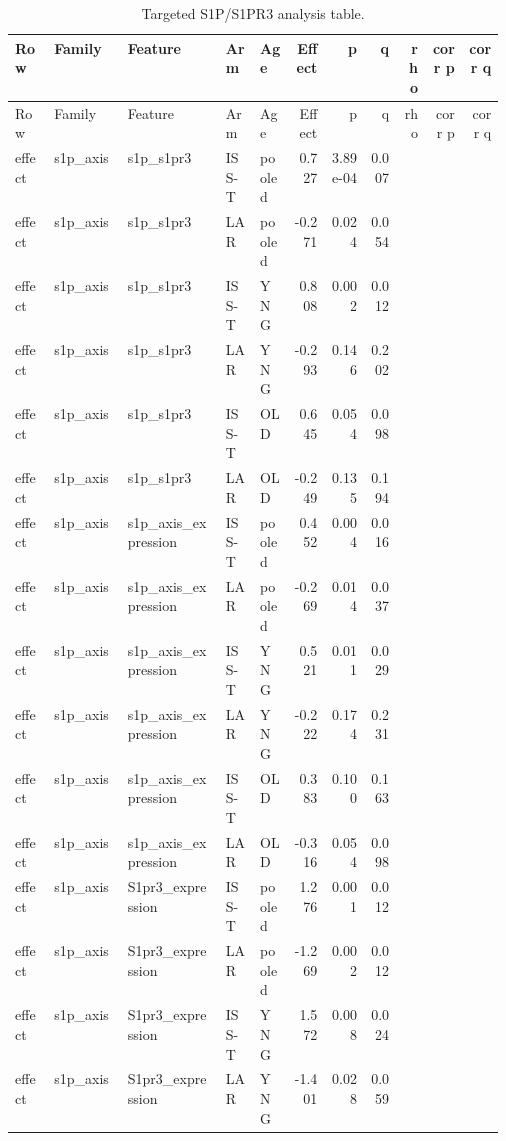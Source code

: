 \documentclass[11pt]{article}
\begin{document}
\begin{landscape}
\scriptsize
\setlength{\tabcolsep}{3pt}
\begin{longtable}{p{0.08\linewidth}p{0.15\linewidth}p{0.20\linewidth}p{0.07\linewidth}p{0.07\linewidth}rrrrrr}
\caption{Targeted S1P/S1PR3 analysis table.}\\
\toprule
Row & Family & Feature & Arm & Age & Effect & p & q & rho & corr p & corr q \\
\midrule
\endfirsthead
\toprule
Row & Family & Feature & Arm & Age & Effect & p & q & rho & corr p & corr q \\
\midrule
\endhead
effect & s1p\_axis & s1p\_s1pr3 & ISS-T & pooled & 0.727 & 3.89e-04 & 0.007 &  &  &  \\
effect & s1p\_axis & s1p\_s1pr3 & LAR & pooled & -0.271 & 0.024 & 0.054 &  &  &  \\
effect & s1p\_axis & s1p\_s1pr3 & ISS-T & YNG & 0.808 & 0.002 & 0.012 &  &  &  \\
effect & s1p\_axis & s1p\_s1pr3 & LAR & YNG & -0.293 & 0.146 & 0.202 &  &  &  \\
effect & s1p\_axis & s1p\_s1pr3 & ISS-T & OLD & 0.645 & 0.054 & 0.098 &  &  &  \\
effect & s1p\_axis & s1p\_s1pr3 & LAR & OLD & -0.249 & 0.135 & 0.194 &  &  &  \\
effect & s1p\_axis & s1p\_axis\_expression & ISS-T & pooled & 0.452 & 0.004 & 0.016 &  &  &  \\
effect & s1p\_axis & s1p\_axis\_expression & LAR & pooled & -0.269 & 0.014 & 0.037 &  &  &  \\
effect & s1p\_axis & s1p\_axis\_expression & ISS-T & YNG & 0.521 & 0.011 & 0.029 &  &  &  \\
effect & s1p\_axis & s1p\_axis\_expression & LAR & YNG & -0.222 & 0.174 & 0.231 &  &  &  \\
effect & s1p\_axis & s1p\_axis\_expression & ISS-T & OLD & 0.383 & 0.100 & 0.163 &  &  &  \\
effect & s1p\_axis & s1p\_axis\_expression & LAR & OLD & -0.316 & 0.054 & 0.098 &  &  &  \\
effect & s1p\_axis & S1pr3\_expression & ISS-T & pooled & 1.276 & 0.001 & 0.012 &  &  &  \\
effect & s1p\_axis & S1pr3\_expression & LAR & pooled & -1.269 & 0.002 & 0.012 &  &  &  \\
effect & s1p\_axis & S1pr3\_expression & ISS-T & YNG & 1.572 & 0.008 & 0.024 &  &  &  \\
effect & s1p\_axis & S1pr3\_expression & LAR & YNG & -1.401 & 0.028 & 0.059 &  &  &  \\

\end{longtable}
\end{landscape}
\end{document}
